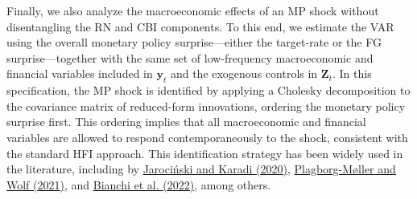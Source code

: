 \documentclass[\latexroot/\projectname]{subfiles}
\begin{document}
Finally, we also analyze the macroeconomic effects of an MP shock without disentangling the RN and CBI components. To this end, we estimate the VAR using the overall monetary policy surprise—either the target-rate or the FG surprise—together with the same set of low-frequency macroeconomic and financial variables included in $\boldsymbol{y}_t$ and the exogenous controls in $\boldsymbol{Z}_t$. In this specification, the MP shock is identified by applying a Cholesky decomposition to the covariance matrix of reduced-form innovations, ordering the monetary policy surprise first. This ordering implies that all macroeconomic and financial variables are allowed to respond contemporaneously to the shock, consistent with the standard HFI approach. This identification strategy has been widely used in the literature, including by \hyperlink{JK (2020)}{Jarociński and Karadi (2020)}, \hyperlink{Plagborg-Møller and Wolf (2021)}{Plagborg-Møller and Wolf (2021)}, and \hyperlink{Bianchi et al. (2022)}{Bianchi et al. (2022)}, among others.

\smartbib
\end{document}
